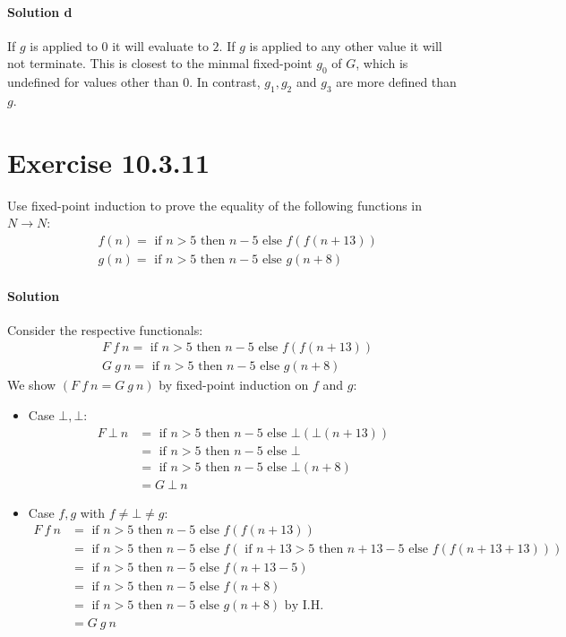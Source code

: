 \documentclass{article}[12pt]
\newcommand{\myif}{\ensuremath{\text{ if }}}
\newcommand{\then}{\ensuremath{\text{ then }}}
\newcommand{\myelse}{\ensuremath{\text{ else }}}
\begin{document}
\paragraph{Solution d}

If $g$ is applied to $0$ it will evaluate to $2$. If $g$ is applied to any other value
it will not terminate. This is closest to the minmal fixed-point $g_0$ of $G$, which
is undefined for values other than $0$. In contrast, $g_1, g_2$ and $g_3$ are more
defined than $g$.

\section{Exercise 10.3.11}
Use fixed-point induction to prove the equality of the following functions in $N \rightarrow N$:
\begin{align*}
    &f(n) = \myif n > 5 \then n - 5 \myelse f(f(n+13))\\
    &g(n) = \myif n > 5 \then n - 5 \myelse g(n+8)
\end{align*}

\paragraph{Solution}
Consider the respective functionals:
\begin{align*}
    &F\ f\ n = \myif n > 5 \then n - 5 \myelse f(f(n+13))\\
    &G\ g\ n = \myif n > 5 \then n - 5 \myelse g(n+8)
\end{align*}
We show $(F\ f\ n = G\ g\ n)$ by fixed-point induction on $f$ and $g$:
\begin{itemize}
    \item Case $\bot, \bot$:
    \begin{align*}
        F\ \bot\ n &= \myif n > 5 \then n - 5 \myelse \bot(\bot(n+13))\\
                  &= \myif n > 5 \then n - 5 \myelse \bot\\
                  &= \myif n > 5 \then n - 5 \myelse \bot(n+8)\\
                  &= G\ \bot\ n
    \end{align*}
    \item Case $f,g$ with $f \neq \bot \neq g$:
    \begin{align*}
        F\ f\ n &= \myif n > 5 \then n - 5 \myelse f(f(n+13))\\
              &= \myif n > 5 \then n - 5 \myelse f(\myif n + 13 > 5 \then n + 13 - 5 \myelse f(f(n+13+13)))\\
              &= \myif n > 5 \then n - 5 \myelse f(n+13-5)\\
              &= \myif n > 5 \then n - 5 \myelse f(n+8)\\
              &= \myif n > 5 \then n - 5 \myelse g(n+8) \text{ by I.H.}\\
              &= G\ g\ n
    \end{align*}
\end{itemize}
\end{document}
